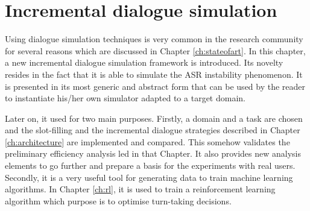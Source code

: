 \chapter{Incremental dialogue simulation}
\label{ch:simulation}

	
	Using dialogue simulation techniques is very common in the research community \cite{Eckert1997,Pietquin2013} for several reasons which are discussed in Chapter \ref{ch:stateofart}. In this chapter, a new incremental dialogue simulation framework is introduced. Its novelty resides in the fact that it is able to simulate the ASR instability phenomenon. It is presented in its most generic and abstract form that can be used by the reader to instantiate his/her own simulator adapted to a target domain.
	
	Later on, it used for two main purposes. Firstly, a domain and a task are chosen and the slot-filling and the incremental dialogue strategies described in Chapter \ref{ch:architecture} are implemented and compared. This somehow validates the preliminary efficiency analysis led in that Chapter. It also provides new analysis elements to go further and prepare a basis for the experiments with real users. Secondly, it is a very useful tool for generating data to train machine learning algorithms. In Chapter \ref{ch:rl}, it is used to train a reinforcement learning algorithm which purpose is to optimise turn-taking decisions.
	

